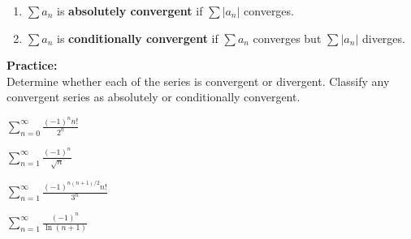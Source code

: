 \begin{tcolorbox}[title= DEFINITIONS OF ABSOLUTE AND CONDITIONAL CONVERGENCE,colframe=black,sharp corners,colback=white,colbacktitle=white,coltitle=black]

    \begin{enumerate}
        \item $\displaystyle\sum a_n$ is \textbf{absolutely convergent} if $\displaystyle\sum\left|a_n\right|$ converges.
        \item $\displaystyle\sum a_n$ is \textbf{conditionally convergent} if $\displaystyle\sum a_n$ converges but $\displaystyle\sum\left|a_n\right|$ diverges.
    \end{enumerate}

\end{tcolorbox}
\vspace{.1in}
\noindent\textbf{Practice:}\\
Determine whether each of the series is convergent or divergent. Classify any convergent series as absolutely or conditionally convergent.
\begin{questions}
    
    \begin{minipage}{0.45\linewidth}
    \question $\displaystyle\sum_{n=0}^\infty \frac{(-1)^n n!}{2^n}$
    \end{minipage}
    \hfill
    \begin{minipage}{0.45\linewidth}
    \question $\displaystyle\sum_{n=1}^\infty \frac{(-1)^n}{\sqrt{n}}$
    \end{minipage}
    
    \begin{minipage}{0.45\linewidth}
    \question $\displaystyle\sum_{n=1}^\infty \frac{(-1)^{n(n+1)/2} n!}{3^n}$
    \end{minipage}
    \hfill
    \begin{minipage}{0.45\linewidth}
    \question $\displaystyle\sum_{n=1}^\infty \frac{(-1)^n}{\ln(n+1)}$
    \end{minipage}
    
    
\end{questions}


\newpage
